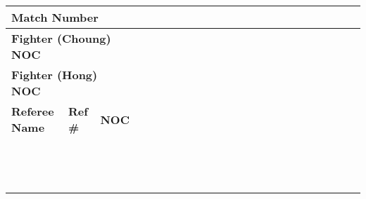 \documentclass[letterpaper,12pt]{article}
\begin{document}
	
	
	\centering
	\footnotesize %
	\setlength\doublerulesep{0.5cm} 
	\begin{tabular}{|p{4.5cm}|p{1.1cm}|p{1.1cm}
			|p{0.5cm}|p{0.5cm}|p{0.5cm}|p{0.5cm}|p{0.5cm}|p{0.5cm}|p{0.5cm}|p{0.5cm}|p{0.5cm}|p{0.5cm}|p{0.5cm}|p{0.5cm}|p{0.5cm}|p{0.5cm}|p{0.5cm}|p{0.5cm}|p{0.5cm}|p{0.5cm}|p{0.5cm}|p{0.5cm}|}
		\hline
		\multicolumn{3}{|l|}{\textbf{Match Number}} & & & & & & & & & & & & & & & & & & & & \\
		\hline
		\multicolumn{3}{|l|}{\textbf{Fighter (Choung) NOC}} & & & & & & & & & & & & & & & & & & & & \\
		\hline
		\multicolumn{3}{|l|}{\textbf{Fighter (Hong) NOC}} & & & & & & & & & & & & & & & & & & & & \\
		\hline
		\hline
		\textbf{Referee Name} & \textbf{Ref \#} & \textbf{NOC} & & & & & & & & & & & & & & & & & & & & \\
		\hline
		& & & & & & & & & & & & & & & & & & & & & & \\
		\hline
		& & & & & & & & & & & & & & & & & & & & & & \\
		\hline
		& & & & & & & & & & & & & & & & & & & & & & \\
		\hline
		& & & & & & & & & & & & & & & & & & & & & & \\
		\hline
		& & & & & & & & & & & & & & & & & & & & & & \\
		\hline
		& & & & & & & & & & & & & & & & & & & & & & \\
		\hline
		& & & & & & & & & & & & & & & & & & & & & & \\
		\hline
		& & & & & & & & & & & & & & & & & & & & & & \\
		\hline
		& & & & & & & & & & & & & & & & & & & & & & \\
		\hline
		& & & & & & & & & & & & & & & & & & & & & & \\
		\hline
		& & & & & & & & & & & & & & & & & & & & & & \\
		\hline
		& & & & & & & & & & & & & & & & & & & & & & \\
		\hline
		& & & & & & & & & & & & & & & & & & & & & & \\
		\hline

	\end{tabular}
	
\end{document}

